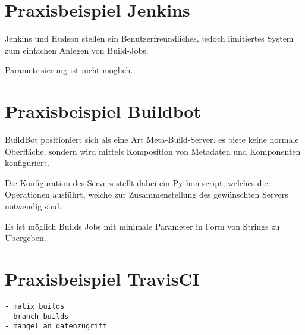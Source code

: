 \section{Praxisbeispiel Jenkins}

Jenkins und Hudson stellen ein Benutzerfreundliches,
jedoch limitiertes System zum einfachen Anlegen von Build-Jobs.

Parametrisierung ist nicht möglich.

\section{Praxisbeispiel Buildbot}

BuildBot positioniert sich als eine Art Meta-Build-Server.
es biete keine normale Oberfläche, sondern wird mittels
Komposition von Metadaten und Komponenten konfiguriert.

Die Konfiguration des Servers stellt dabei ein Python script,
welches die Operationen ausführt, welche zur Zusammenstellung des gewünschten Servers notwendig sind.

Es ist möglich Builds Jobs mit minimale Parameter in Form von Strings zu Übergeben.

\section{Praxisbeispiel TravisCI}

\begin{verbatim}
- matix builds
- branch builds
- mangel an datenzugriff
\end{verbatim}
